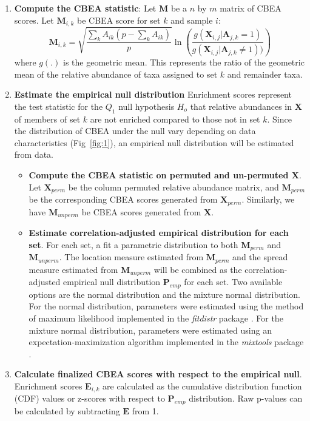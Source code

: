 \begin{enumerate}
    \item \textbf{Compute the CBEA statistic}: Let $\mathbf{M}$ be a $n$ by $m$ matrix of CBEA scores. Let $\mathbf{M}_{i,k}$ be CBEA score for set $k$ and sample $i$:   
    \begin{equation}\label{main_eq}
        \mathbf{M}_{i,k} = \sqrt{\frac{\sum_k A_{ik}(p - \sum_k A_{ik})}{p}} \ln \left( \frac{g(\mathbf{X}_{i,j}|\mathbf{A}_{j,k} = 1)}{g(\mathbf{X}_{i,j}|\mathbf{A}_{j,k} \neq 1))} \right)
    \end{equation}
    where $g(.)$ is the geometric mean. This represents the ratio of the geometric mean of the relative abundance of taxa assigned to set $k$ and remainder taxa. 
    \item \textbf{Estimate the empirical null distribution} Enrichment scores represent the test statistic for the $Q_1$ null hypothesis $H_o$ that relative abundances in $\mathbf{X}$ of members of set $k$ are not enriched compared to those not in set $k$. Since the distribution of CBEA under the null vary depending on data characteristics (Fig~\ref{fig:1}), an empirical null distribution will be estimated from data.
    \begin{itemize}
        \item \textbf{Compute the CBEA statistic on permuted and un-permuted $\mathbf{X}$}.  Let $\mathbf{X}_{perm}$ be the column permuted relative abundance matrix, and $\mathbf{M}_{perm}$ be the corresponding CBEA scores generated from $\mathbf{X}_{perm}$. Similarly, we have $\mathbf{M}_{unperm}$ be CBEA scores generated from $\mathbf{X}$.
        \item \textbf{Estimate correlation-adjusted empirical distribution for each set}. For each set, a fit a parametric distribution to both $\mathbf{M}_{perm}$ and $\mathbf{M}_{unperm}$. The location measure estimated from $\mathbf{M}_{perm}$ and the spread measure estimated from $\mathbf{M}_{unperm}$ will be combined as the correlation-adjusted empirical null distribution $\mathbf{P}_{emp}$ for each set. Two available options are the normal distribution and the mixture normal distribution. For the normal distribution, parameters were estimated using the method of maximum likelihood implemented in the \emph{fitdistr} package \cite{delignette-muller2015}. For the mixture normal distribution, parameters were estimated using an expectation-maximization algorithm implemented in the \emph{mixtools} package \cite{benaglia2009}. 
    \end{itemize}
    \item \textbf{Calculate finalized CBEA scores with respect to the empirical null}. Enrichment scores $\mathbf{E}_{i,k}$ are calculated as the cumulative distribution function (CDF) values or z-scores with respect to $\mathbf{P}_{emp}$ distribution. Raw p-values can be calculated by subtracting $\mathbf{E}$ from 1. 
\end{enumerate}

